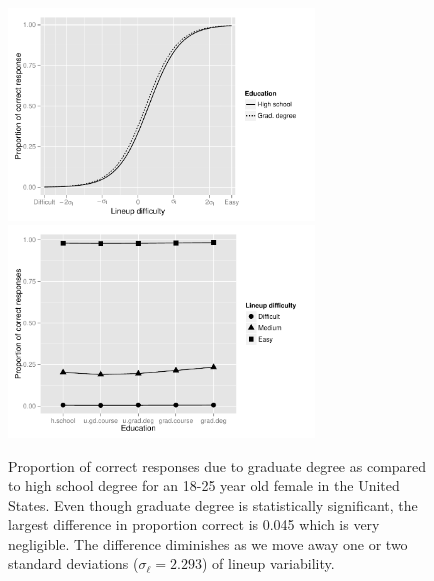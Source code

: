 \documentclass[10pt]{article}\usepackage[]{graphicx}\usepackage[]{color}
\begin{document}
\begin{figure}[htbp] 
   \centering
    \includegraphics[width=3.2in]{practical_impact_graduate.pdf} 
    \includegraphics[width=3.2in]{practical_impact_degree.pdf} 
   \caption{Proportion of correct responses due to graduate degree as compared to high school degree for an 18-25 year old female in the United States. Even though graduate degree is statistically significant, the largest difference in proportion correct is  0.045 which is very negligible. The difference diminishes as we move away one or two standard deviations ($\sigma_{\ell} =2.293$) 
   of lineup variability.}
   \label{fig:practical_impact_graduate}
\end{figure}






\end{document}
